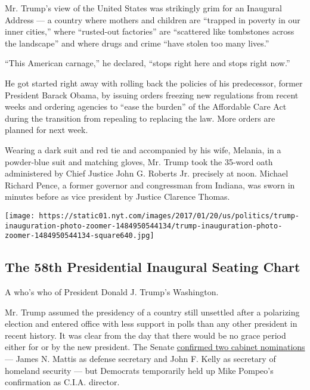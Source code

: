 Mr. Trump's view of the United States was strikingly grim for an
Inaugural Address --- a country where mothers and children are ``trapped
in poverty in our inner cities,'' where ``rusted-out factories'' are
``scattered like tombstones across the landscape'' and where drugs and
crime ``have stolen too many lives.''

``This American carnage,'' he declared, ``stops right here and stops
right now.''

He got started right away with rolling back the policies of his
predecessor, former President Barack Obama, by issuing orders freezing
new regulations from recent weeks and ordering agencies to ``ease the
burden'' of the Affordable Care Act during the transition from repealing
to replacing the law. More orders are planned for next week.

Wearing a dark suit and red tie and accompanied by his wife, Melania, in
a powder-blue suit and matching gloves, Mr. Trump took the 35-word oath
administered by Chief Justice John G. Roberts Jr. precisely at noon.
Michael Richard Pence, a former governor and congressman from Indiana,
was sworn in minutes before as vice president by Justice Clarence
Thomas.

\href{https://www.nytimes.com/interactive/2017/01/20/us/politics/trump-inauguration-photo-zoomer.html}{}

\texttt{[image: https://static01.nyt.com/images/2017/01/20/us/politics/trump-inauguration-photo-zoomer-1484950544134/trump-inauguration-photo-zoomer-1484950544134-square640.jpg]}

\hypertarget{the-58th-presidential-inaugural-seating-chart}{%
\subsection{The 58th Presidential Inaugural Seating
Chart}\label{the-58th-presidential-inaugural-seating-chart}}

A who's who of President Donald J. Trump's Washington.

Mr. Trump assumed the presidency of a country still unsettled after a
polarizing election and entered office with less support in polls than
any other president in recent history. It was clear from the day that
there would be no grace period either for or by the new president. The
Senate
\href{https://www.nytimes.com/2017/01/20/us/politics/trump-cabinet-confirmation-mattis-kelly}{confirmed
two cabinet nominations} --- James N. Mattis as defense secretary and
John F. Kelly as secretary of homeland security --- but Democrats
temporarily held up Mike Pompeo's confirmation as C.I.A. director.

